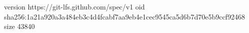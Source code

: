 version https://git-lfs.github.com/spec/v1
oid sha256:1a21a920a3a484eb3c4d4fcabf7aa9eb4e1cec9545ca5d6b7d70e5b9ccf92468
size 43840
